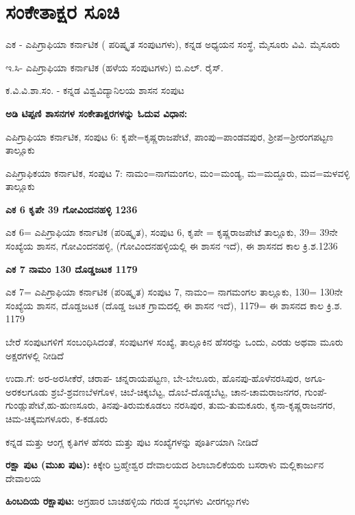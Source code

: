 \chapter*{ಸಂಕೇತಾಕ್ಷರ ಸೂಚಿ}

\noindent
ಎಕ - ಎಪಿಗ್ರಾಫಿಯಾ ಕರ್ನಾಟಿಕ ( ಪರಿಷ್ಕೃತ ಸಂಪುಟಗಳು), ಕನ್ನಡ ಅಧ್ಯಯನ ಸಂಸ್ಥೆ, ಮೈಸೂರು ವಿವಿ. ಮೈಸೂರು

\noindent
ಇ.ಸಿ- ಎಪಿಗ್ರಾಫಿಯಾ ಕರ್ನಾಟಿಕ (ಹಳೆಯ ಸಂಪುಟಗಳು) ಬಿ.ಎಲ್​. ರೈಸ್​.

\noindent
ಕ.ವಿ.ವಿ.ಶಾ.ಸಂ. - ಕನ್ನಡ ವಿಶ್ವವಿದ್ಯಾನಿಲಯ ಶಾಸನ ಸಂಪುಟ

\noindent
\textbf{ಅಡಿ ಟಿಪ್ಪಣಿ ಶಾಸನಗಳ ಸಂಕೇತಾಕ್ಷರಗಳನ್ನು ಓದುವ ವಿಧಾನ:}

\noindent
ಎಪಿಗ್ರಾಫಿಯಾ ಕರ್ನಾಟಿಕ, ಸಂಪುಟ 6: ಕೃಪೇ=ಕೃಷ್ಣರಾಜಪೇಟೆ, ಪಾಂಪು=ಪಾಂಡವಪುರ, ಶ‍್ರೀಪ=ಶ‍್ರೀರಂಗಪಟ್ಟಣ ತಾಲ್ಲೂಕು

\noindent
ಎಪಿಗ್ರಾಫಿಕಯಾ ಕರ್ನಾಟಿಕ, ಸಂಪುಟ 7: ನಾಮಂ=ನಾಗಮಂಗಲ, ಮಂ=ಮಂಡ್ಯ, ಮ=ಮದ್ದೂರು, ಮವ=ಮಳವಳ್ಳಿ ತಾಲ್ಲೂಕು

\noindent
\textbf{ಎಕ 6 ಕೃಪೇ 39 ಗೋವಿಂದನಹಳ್ಳಿ 1236}

\noindent
ಎಕ 6= ಎಪಿಗ್ರಾಫಿಯಾ ಕರ್ನಾಟಿಕ (ಪರಿಷ್ಕೃತ), ಸಂಪುಟ 6, ಕೃಪೇ = ಕೃಷ್ಣರಾಜಪೇಟೆ ತಾಲ್ಲೂಕು, 39= 39ನೇ ಸಂಖ್ಯೆಯ ಶಾಸನ, ಗೋವಿಂದನಹಳ್ಳಿ, (ಗೋವಿಂದನಹಳ್ಳಿಯಲ್ಲಿ ಈ ಶಾಸನ ಇದೆ), ಈ ಶಾಸನದ ಕಾಲ ಕ್ರಿ.ಶ.1236

\noindent
\textbf{ಎಕ 7 ನಾಮಂ 130 ದೊಡ್ಡಜಟಕ 1179}

\noindent
ಎಕ 7= ಎಪಿಗ್ರಾಫಿಯಾ ಕರ್ನಾಟಿಕ (ಪರಿಷ್ಕೃತ) ಸಂಪುಟ 7, ನಾಮಂ= ನಾಗಮಂಗಲ ತಾಲ್ಲೂಕು, 130= 130ನೇ ಸಂಖ್ಯೆಯ ಶಾಸನ, ದೊಡ್ಡಜಟಕ (ದೊಡ್ಡ ಜಟಕ ಗ್ರಾಮದಲ್ಲಿ ಈ ಶಾಸನ ಇದೆ), 1179= ಈ ಶಾಸನದ ಕಾಲ ಕ್ರಿ.ಶ. 1179

\noindent
ಬೇರೆ ಸಂಪುಟಗಳಿಗೆ ಸಂಬಂಧಿಸಿದಂತೆ, ಸಂಪುಟಗಳ ಸಂಖ್ಯೆ, ತಾಲ್ಲೂಕಿನ ಹೆಸರನ್ನು ಒಂದು, ಎರಡು ಅಥವಾ ಮೂರು ಅಕ್ಷರ\-ಗಳಲ್ಲಿ ನೀಡಿದೆ

\noindent
ಉದಾ.ಗೆ: ಅರ-ಅರಸೀಕೆರೆ, ಚರಾಪ- ಚನ್ನರಾಯಪಟ್ಟಣ, ಬೇ-ಬೇಲೂರು, ಹೊನಪು-ಹೊಳೆನರಸಿಪುರ, ಅಗೂ-ಅರಕಲ\-ಗೂಡು ಶ್ರಬೆ-ಶ್ರವಣಬೆಳಗೊಳ, ಚಿಬೆ-ಚಿಕ್ಕಬೆಟ್ಟ, ದೊಬೆ-ದೊಡ್ಡಬೆಟ್ಟ, ಚಾನ-ಚಾಮರಾಜನಗರ, ಗುಂಪೆ-ಗುಂಡ್ಲುಪೇಟೆ,\break ಹು-ಹುಣಸೂರು, ತಿನಪು-ತಿರುಮಕೂಡಲು ನರಸಿಪುರ, ತುಮ-ತುಮಕೂರು, ಕೃನಾ-ಕೃಷ್ಣರಾಜನಗರ, ಚಿಮ-ಚಿಕ್ಕ\-ಮಗಳೂರು, ಕ-ಕಡೂರು

\noindent
ಕನ್ನಡ ಮತ್ತು ಆಂಗ್ಲ ಕೃತಿಗಳ ಹೆಸರು ಮತ್ತು ಪುಟ ಸಂಖ್ಯೆಗಳನ್ನು ಪೂರ್ತಿಯಾಗಿ ನೀಡಿದೆ

\delimiter

\textbf{ರಕ್ಷಾ ಪುಟ (ಮುಖ ಪುಟ):} ಕಿಕ್ಕೇರಿ ಬ್ರಹ್ಮೇಶ್ವರ ದೇವಾಲಯದ ಶಿಲಾಬಾಲಿಕೆಯರು ಬಸರಾಳು ಮಲ್ಲಿಕಾರ್ಜುನ ದೇವಾಲಯ

\textbf{ಹಿಂಬದಿಯ ರಕ್ಷಾಪುಟ:} ಅಗ್ರಹಾರ ಬಾಚಹಳ್ಳಿಯ ಗರುಡ ಸ್ಥಂಭಗಳು ವೀರಗಲ್ಲುಗಳು

